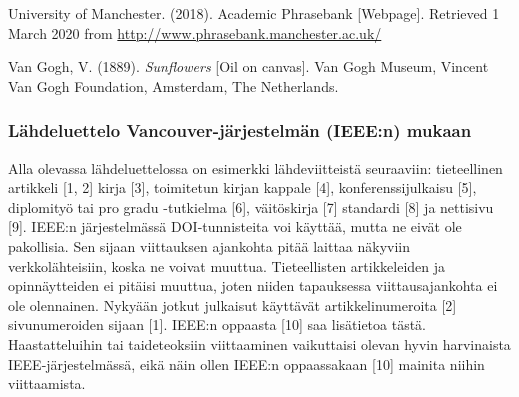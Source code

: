 \documentclass[finnish, 12pt, a4paper, arts, utf8, a-2b, online]{aaltothesis}
\begin{document}
\vspace{1ex}
\noindent
University of Manchester. (2018). Academic Phrasebank [Webpage]. 
Retrieved 1 March 2020 from \url{http://www.phrasebank.manchester.ac.uk/}

\vspace{1ex}
\noindent
Van Gogh, V. (1889). \textit{Sunflowers} [Oil on canvas]. 
Van Gogh Museum, Vincent Van Gogh Foundation, Amsterdam, The Netherlands.


\subsubsection*{Lähdeluettelo Vancouver-järjestelmän (IEEE:n) mukaan}

Alla olevassa lähdeluettelossa on esimerkki lähdeviitteistä seuraaviin: 
tieteellinen artikkeli [1, 2] kirja [3], toimitetun kirjan kappale [4], 
konferenssijulkaisu [5], diplomityö tai pro gradu -tutkielma [6], väitöskirja 
[7] standardi [8] ja nettisivu [9]. IEEE:n järjestelmässä DOI-tunnisteita voi 
käyttää, mutta ne eivät ole pakollisia. Sen sijaan viittauksen ajankohta pitää 
laittaa näkyviin verkkolähteisiin, koska ne voivat muuttua. Tieteellisten 
artikkeleiden ja opinnäytteiden ei pitäisi muuttua, joten niiden tapauksessa 
viittausajankohta ei ole olennainen. Nykyään jotkut julkaisut käyttävät 
artikkelinumeroita [2] sivunumeroiden sijaan [1]. IEEE:n oppaasta [10] saa 
lisätietoa tästä. Haastatteluihin tai taideteoksiin viittaaminen vaikuttaisi 
olevan hyvin harvinaista IEEE-järjestelmässä, eikä näin ollen IEEE:n 
oppaassakaan [10] mainita niihin viittaamista.
\end{document}
